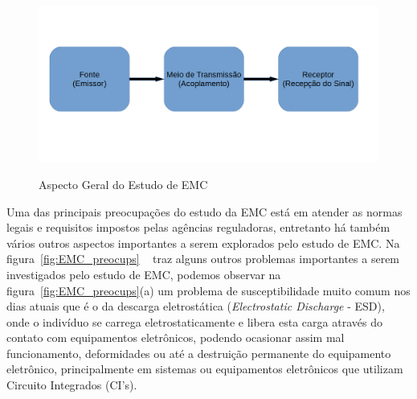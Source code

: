 \begin{figure}[htb!]
	\centering 
	\caption{Aspecto Geral do Estudo de EMC}
	\includegraphics[scale=0.4]{./img/fundamentacao_001}
	\label{fig:EMC_couplling_problem}
\end{figure}

Uma das principais preocupações do estudo da EMC está em atender as normas legais e requisitos impostos pelas agências reguladoras, entretanto há também vários outros aspectos importantes a serem explorados pelo estudo de EMC. Na figura~\ref{fig:EMC_preocups} ~ traz alguns outros problemas importantes a serem investigados pelo estudo de EMC, podemos observar na figura~\ref{fig:EMC_preocups}(a) um problema de susceptibilidade muito comum nos dias atuais que é o da descarga eletrostática (\textit{Electrostatic Discharge} - ESD), onde o indivíduo se carrega eletrostaticamente e libera esta carga através do contato com equipamentos eletrônicos, podendo ocasionar assim mal funcionamento, deformidades ou até a destruição permanente do equipamento eletrônico, principalmente em sistemas ou equipamentos eletrônicos que utilizam Circuito Integrados (CI's). 

